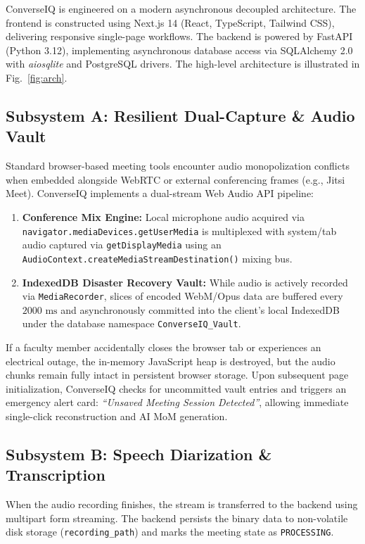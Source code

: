 \documentclass[conference]{IEEEtran}
\begin{document}
ConverseIQ is engineered on a modern asynchronous decoupled architecture. The frontend is constructed using Next.js 14 (React, TypeScript, Tailwind CSS), delivering responsive single-page workflows. The backend is powered by FastAPI (Python 3.12), implementing asynchronous database access via SQLAlchemy 2.0 with \textit{aiosqlite} and PostgreSQL drivers. The high-level architecture is illustrated in Fig.~\ref{fig:arch}.

\subsection{Subsystem A: Resilient Dual-Capture & Audio Vault}
Standard browser-based meeting tools encounter audio monopolization conflicts when embedded alongside WebRTC or external conferencing frames (e.g., Jitsi Meet). ConverseIQ implements a dual-stream Web Audio API pipeline:
\begin{enumerate}
    \item \textbf{Conference Mix Engine:} Local microphone audio acquired via \texttt{navigator.mediaDevices.getUserMedia} is multiplexed with system/tab audio captured via \texttt{getDisplayMedia} using an \texttt{AudioContext.createMediaStreamDestination()} mixing bus.
    \item \textbf{IndexedDB Disaster Recovery Vault:} While audio is actively recorded via \texttt{MediaRecorder}, slices of encoded WebM/Opus data are buffered every $2000\text{ ms}$ and asynchronously committed into the client's local IndexedDB under the database namespace \texttt{ConverseIQ\_Vault}.
\end{enumerate}

If a faculty member accidentally closes the browser tab or experiences an electrical outage, the in-memory JavaScript heap is destroyed, but the audio chunks remain fully intact in persistent browser storage. Upon subsequent page initialization, ConverseIQ checks for uncommitted vault entries and triggers an emergency alert card: \textit{``Unsaved Meeting Session Detected''}, allowing immediate single-click reconstruction and AI MoM generation.

\subsection{Subsystem B: Speech Diarization & Transcription}
When the audio recording finishes, the stream is transferred to the backend using multipart form streaming. The backend persists the binary data to non-volatile disk storage (\texttt{recording\_path}) and marks the meeting state as \texttt{PROCESSING}.
\end{document}
